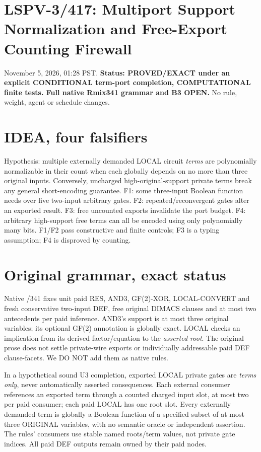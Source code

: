 \documentclass{article}
\begin{document}
\section*{LSPV-3/417: Multiport Support Normalization and Free-Export Counting Firewall}
\noindent November 5, 2026, 01:28 PST. \textbf{Status: PROVED/EXACT under an explicit CONDITIONAL term-port completion, COMPUTATIONAL finite tests. Full native Rmix341 grammar and B3 OPEN.} No rule, weight, agent or schedule changes.

\section*{IDEA, four falsifiers}
Hypothesis: multiple externally demanded LOCAL circuit \emph{terms} are polynomially normalizable in their count when each globally depends on no more than three original inputs. Conversely, uncharged high-original-support private terms break any general short-encoding guarantee. F1: some three-input Boolean function needs over five two-input arbitrary gates. F2: repeated/reconvergent gates alter an exported result. F3: free uncounted exports invalidate the port budget. F4: arbitrary high-support free terms can all be encoded using only polynomially many bits. F1/F2 pass constructive and finite controls; F3 is a typing assumption; F4 is disproved by counting.

\section*{Original grammar, exact status}
Native /341 fixes unit paid RES, AND3, GF(2)-XOR, LOCAL-CONVERT and fresh conservative two-input DEF, free original DIMACS clauses and at most two antecedents per paid inference. AND3's support is at most three original variables; its optional GF(2) annotation is globally exact. LOCAL checks an implication from its derived factor/equation to the \emph{asserted root}. The original prose does not settle private-wire exports or individually addressable paid DEF clause-facets. We DO NOT add them as native rules.

In a hypothetical sound U3 completion, exported LOCAL private gates are \emph{terms only}, never automatically asserted consequences. Each external consumer references an exported term through a counted charged input slot, at most two per paid consumer; each paid LOCAL has one root slot. Every externally demanded term is globally a Boolean function of a specified subset of at most three ORIGINAL variables, with no semantic oracle or independent assertion. The rules' consumers use stable named roots/term values, not private gate indices. All paid DEF outputs remain owned by their paid nodes.
\end{document}
